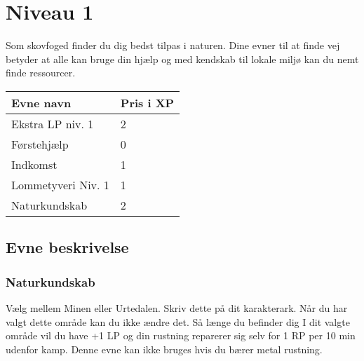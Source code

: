 \chapter*{Niveau 1}

Som skovfoged finder du dig bedst tilpas i naturen. Dine evner til at finde vej betyder at alle kan bruge din hjælp og med kendskab til lokale miljø kan du nemt finde ressourcer.

\begin{table}[H]
    \centering
    \begin{tabular}{|p{}|p{}|}
    \rowcolor{cerulean!80}\hline
        Evne navn & Pris i XP \\\hline
        Ekstra LP niv. 1 &2\\\hline 
        Førstehjælp & 0 \\\hline
        Indkomst & 1\\\hline
        Lommetyveri Niv. 1 &1\\\hline
        Naturkundskab &2\\\hline
    \end{tabular}
\end{table}

\section*{Evne beskrivelse}









\subsection*{Naturkundskab}
Vælg mellem Minen eller Urtedalen. Skriv dette på dit karakterark. Når du har valgt dette område kan du ikke ændre det. Så længe du befinder dig I dit valgte område vil du have +1 LP og din rustning reparerer sig selv for 1 RP per 10 min udenfor kamp. Denne evne kan ikke bruges hvis du bærer metal rustning.